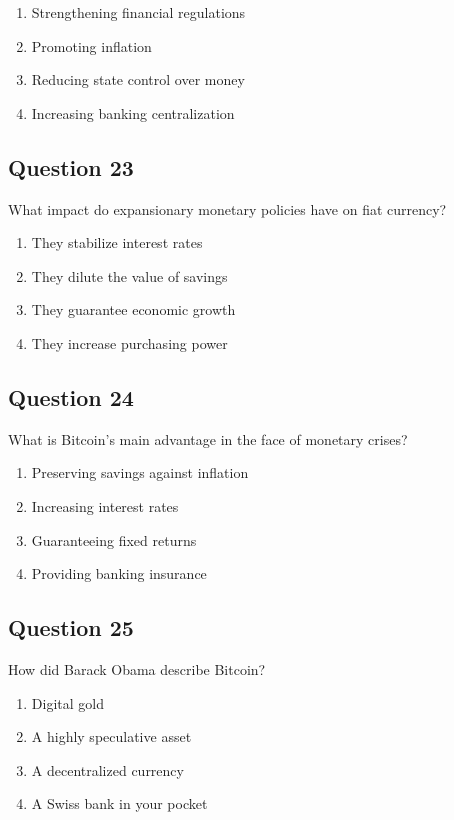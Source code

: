 \documentclass[12pt,a4paper]{article}
\begin{document}
\begin{enumerate}[label=\Alph*., leftmargin=*]
\item Strengthening financial regulations
\item Promoting inflation
\item Reducing state control over money
\item Increasing banking centralization
\end{enumerate}

\bigskip


\subsection*{Question 23}
What impact do expansionary monetary policies have on fiat currency?

\begin{enumerate}[label=\Alph*., leftmargin=*]
\item They stabilize interest rates
\item They dilute the value of savings
\item They guarantee economic growth
\item They increase purchasing power
\end{enumerate}

\bigskip


\subsection*{Question 24}
What is Bitcoin's main advantage in the face of monetary crises?

\begin{enumerate}[label=\Alph*., leftmargin=*]
\item Preserving savings against inflation
\item Increasing interest rates
\item Guaranteeing fixed returns
\item Providing banking insurance
\end{enumerate}

\bigskip


\subsection*{Question 25}
How did Barack Obama describe Bitcoin?

\begin{enumerate}[label=\Alph*., leftmargin=*]
\item Digital gold
\item A highly speculative asset
\item A decentralized currency
\item A Swiss bank in your pocket
\end{enumerate}
\end{document}
